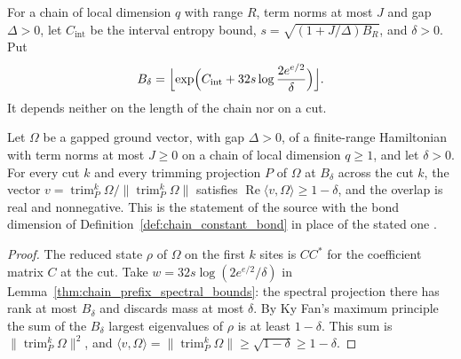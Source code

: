 \begin{definition}
    \label{def:chain_constant_bond}
    \leanok
    For a chain of local dimension $q$ with range $R$, term norms at most $J$
    and gap $\Delta>0$, let $C_{\mathrm{int}}$ be the interval entropy bound,
    $s=\sqrt{(1+J/\Delta)B_R}$, and $\delta>0$. Put
    \begin{align}
        B_\delta=\Bigl\lfloor\exp\Bigl(C_{\mathrm{int}}
        +32s\log\frac{2e^{e/2}}{\delta}\Bigr)\Bigr\rfloor. \notag
    \end{align}
    It depends neither on the length of the chain nor on a cut.
\end{definition}

\begin{lemma}
    \label{thm:chain_constant_bond_overlap}
    \leanok
    Let $\Omega$ be a gapped ground vector, with gap $\Delta>0$, of a
    finite-range Hamiltonian with term norms at most $J\ge0$ on a chain of
    local dimension $q\ge1$, and let $\delta>0$. For every cut $k$ and
    every trimming projection $P$ of $\Omega$ at $B_\delta$ across the cut $k$,
    the vector $v=\operatorname{trim}^k_P\Omega/
        \|\operatorname{trim}^k_P\Omega\|$ satisfies
    $\operatorname{Re}\langle v,\Omega\rangle\ge1-\delta$, and the overlap is
    real and nonnegative. This is the statement of the source with the bond
    dimension of Definition~\ref{def:chain_constant_bond} in place of the
    stated one \cite{gap:lvv13_constant_bond}.
\end{lemma}
\begin{proof}\leanok
    The reduced state $\rho$ of $\Omega$ on the first $k$ sites is $CC^{*}$
    for the coefficient matrix $C$ at the cut. Take
    $w=32s\log(2e^{e/2}/\delta)$ in
    Lemma~\ref{thm:chain_prefix_spectral_bounds}: the spectral projection
    there has rank at most $B_\delta$ and discards mass at most $\delta$. By
    Ky Fan's maximum principle the sum of the $B_\delta$ largest eigenvalues
    of $\rho$ is at least $1-\delta$. This sum is
    $\|\operatorname{trim}^k_P\Omega\|^2$, and
    $\langle v,\Omega\rangle=\|\operatorname{trim}^k_P\Omega\|\ge
        \sqrt{1-\delta}\ge1-\delta$.
\end{proof}


